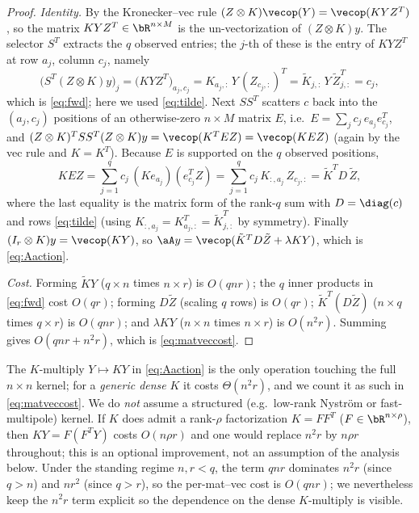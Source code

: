 \begin{proof}
\emph{Identity.} By the Kronecker--vec rule
$(Z\otimes K)\vecop(Y)=\vecop(KYZ^{T})$, so the matrix $KYZ^{T}\in\bR^{n\times M}$
is the un-vectorization of $(Z\otimes K)y$. The selector $S^{T}$ extracts the
$q$ observed entries; the $j$-th of these is the entry of $KYZ^{T}$ at row $a_j$,
column $c_j$, namely
\[
  \bigl(S^{T}(Z\otimes K)y\bigr)_j
  =\bigl(KYZ^{T}\bigr)_{a_j,c_j}
  =K_{a_j,:}\,Y\,(Z_{c_j,:})^{T}
  =\tilde K_{j,:}\,Y\,\tilde Z_{j,:}^{T}=c_j,
\]
which is \eqref{eq:fwd}; here we used \eqref{eq:tilde}. Next $SS^{T}$ scatters
$c$ back into the $(a_j,c_j)$ positions of an otherwise-zero $n\times M$ matrix
$E$, i.e.\ $E=\sum_{j}c_j\,e_{a_j}e_{c_j}^{T}$, and
$(Z\otimes K)^{T}SS^{T}(Z\otimes K)y=\vecop(K^{T}EZ)=\vecop(KEZ)$ (again by the
vec rule and $K=K^{T}$). Because $E$ is supported on the $q$ observed positions,
\[
  KEZ=\sum_{j=1}^{q}c_j\,(Ke_{a_j})(e_{c_j}^{T}Z)
     =\sum_{j=1}^{q}c_j\,K_{:,a_j}\,Z_{c_j,:}
     =\tilde K^{T}D\,\tilde Z,
\]
where the last equality is the matrix form of the rank-$q$ sum with
$D=\diag(c)$ and rows \eqref{eq:tilde} (using $K_{:,a_j}=K_{a_j,:}^{T}=\tilde
K_{j,:}^{T}$ by symmetry). Finally
$(I_r\otimes K)y=\vecop(KY)$, so
$\aA y=\vecop(\tilde K^{T}D\tilde Z+\lambda KY)$, which is \eqref{eq:Aaction}.

\smallskip
\emph{Cost.} Forming $\tilde K Y$ ($q\times n$ times $n\times r$) is $O(qnr)$;
the $q$ inner products in \eqref{eq:fwd} cost $O(qr)$; forming $D\tilde Z$
(scaling $q$ rows) is $O(qr)$; $\tilde K^{T}(D\tilde Z)$
($n\times q$ times $q\times r$) is $O(qnr)$; and $\lambda KY$
($n\times n$ times $n\times r$) is $O(n^{2}r)$. Summing gives
$O(qnr+n^{2}r)$, which is \eqref{eq:matveccost}.
\end{proof}

\begin{remark}\label{rem:honestcost}
The $K$-multiply $Y\mapsto KY$ in \eqref{eq:Aaction} is the only operation
touching the full $n\times n$ kernel; for a \emph{generic dense} $K$ it costs
$\Theta(n^{2}r)$, and we count it as such in \eqref{eq:matveccost}. We do
\emph{not} assume a structured (e.g.\ low-rank Nystr\"om or fast-multipole)
kernel. If $K$ does admit a rank-$\rho$ factorization $K=FF^{T}$
($F\in\bR^{n\times\rho}$), then $KY=F(F^{T}Y)$ costs $O(n\rho r)$ and one would
replace $n^{2}r$ by $n\rho r$ throughout; this is an optional improvement, not
an assumption of the analysis below. Under the standing regime
$n,r<q$, the term $qnr$ dominates $n^{2}r$ (since $q>n$) and $nr^{2}$ (since
$q>r$), so the per-mat--vec cost is $O(qnr)$; we nevertheless keep the
$n^{2}r$ term explicit so the dependence on the dense $K$-multiply is visible.
\end{remark}


